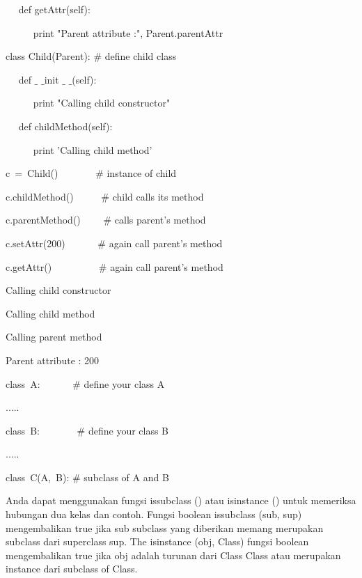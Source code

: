 \begin {enumerate}
~~ def getAttr(self): \par
\noindent 
~~~~~ print "Parent attribute :", Parent.parentAttr \par
\vspace{12pt}
\noindent 
class Child(Parent):  $  \#  $ define child class \par
\noindent 
~~ def  $  \_  $ $  \_  $init $  \_  $ $  \_  $(self): \par
\noindent 
~~~~~ print "Calling child constructor" \par
\vspace{12pt}
\noindent 
~~ def childMethod(self): \par
\noindent 
~~~~~ print 'Calling child method' \par
\vspace{12pt}
\noindent 
c~=~Child()~~~~~~~    $  \#  $ instance of child \par
\noindent 
c.childMethod()~~~~~  $  \#  $ child calls its method \par
\noindent 
c.parentMethod()~~~~  $  \#  $ calls parent's method \par
\noindent 
c.setAttr(200)~~~~~~  $  \#  $ again call parent's method \par
\noindent 
c.getAttr()~~~~~~~~~  $  \#  $ again call parent's method \par
\vspace{12pt}
\noindent 
Calling child constructor \par
\noindent 
Calling child method \par
\noindent 
Calling parent method \par
\noindent 
Parent attribute : 200 \par
\vspace{12pt}
\noindent 
class~A:~~~~~~   $  \#  $ define your class A \par
\noindent 
..... \par
\vspace{12pt}
\noindent 
class~B:~~~~~~~   $  \#  $ define your class B \par
\noindent 
..... \par
\vspace{12pt}
\noindent 
class~C(A,~B):    $  \#  $ subclass of A and B \par
\vspace{12pt}
Anda dapat menggunakan fungsi issubclass () atau isinstance () untuk memeriksa hubungan dua kelas dan contoh. Fungsi boolean issubclass (sub, sup) mengembalikan true jika sub subclass yang diberikan memang merupakan subclass dari superclass sup. The isinstance (obj, Class) fungsi boolean mengembalikan true jika obj adalah turunan dari Class Class atau merupakan instance dari subclass of Class. \par

\end{enumerate}
